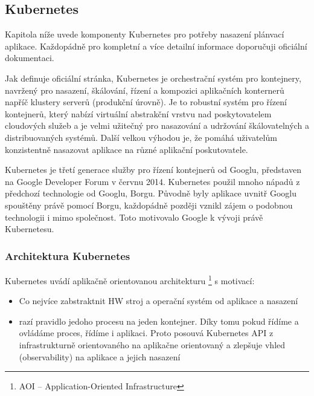 \documentclass[thesis=M,czech]{FITthesis}[2019/12/23]
\theoremstyle{plain}
\theoremstyle{definition}
\begin{document}
\subsection{Kubernetes}

Kapitola níže uvede komponenty Kubernetes pro potřeby nasazení plánvací aplikace. Každopádně pro kompletní a více detailní informace doporučuji oficiální dokumentaci. 

Jak definuje oficiální stránka, Kubernetes je orchestrační systém pro kontejnery, navržený pro nasazení, škálování, řízení a kompozici aplikačních konternerů napříč klustery serverů (produkční úrovně). Je to robustní systém pro řízení  kontejnerů, který nabízí virtuální abstrakční vrstvu nad poskytovatelem cloudových služeb a je velmi užitečný pro nasazování a udržování škálovatelných a distribuovaných systémů. Další velkou výhodou je, že pomáhá uživatelům konzistentně nasazovat aplikace na různé aplikační poskutovatele.

Kubernetes je třetí generace služby pro řízení kontejnerů od Googlu, představen na Google Developer Forum v červnu 2014. Kubernetes použil mnoho nápadů z předchozí technologie od Googlu, Borgu. Původně byly aplikace uvnitř Googlu spouštěny právě pomocí Borgu, každopádně později vznikl zájem o podobnou technologii i mimo společnost. Toto motivovalo Google k vývoji právě Kubernetesu.  

\subsubsection{Architektura Kubernetes}


Kubernetes uvádí aplikačně orientovanou architekturu \footnote{AOI -- Application-Oriented Infrastructure}\cite{as-k8s-san-kho-lin}
s motivací:


\begin{itemize}  
\item  Co nejvíce zabstraktnit HW stroj a operační systém od aplikace a nasazení 
\item  razí pravidlo jedoho procesu na jeden kontejner. Díky tomu pokud řídíme a ovládáme proces, řídíme i aplikaci. Proto posouvá Kubernetes API z infrastrukturně orientovaného na aplikačne orientovaný a zlepšuje vhled (observability) na aplikace a jejich nasazení


\end{itemize}



\end{document}
